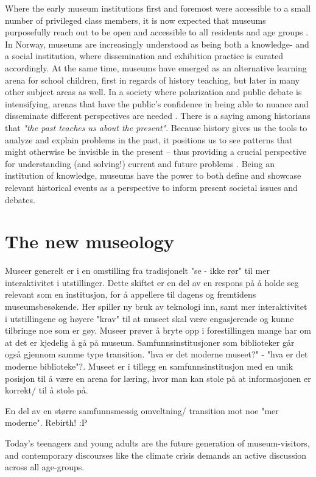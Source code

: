 Where the early museum institutions first and foremost were accessible to a small number of privileged class members, it is now expected that museums purposefully reach out to be open and accessible to all residents and age groups \autocite[p. 14]{melding23}. In Norway, museums are increasingly understood as being both a knowledge- and a social institution, where dissemination and exhibition practice is curated accordingly. At the same time, museums have emerged as an alternative learning arena for school children, first in regards of history teaching, but later in many other subject areas as well. In a society where polarization and public debate is intensifying, arenas that have the public's confidence in being able to nuance and disseminate different perspectives are needed \autocite[p. 7]{melding23}. There is a saying among historians that \emph{"the past teaches us about the present"}. Because history gives us the tools to analyze and explain problems in the past, it positions us to see patterns that might otherwise be invisible in the present – thus providing a crucial perspective for understanding (and solving!) current and future problems \autocite{UW_website}. Being an institution of knowledge, museums have the power to both define and showcase relevant historical events as a perspective to inform present societal issues and debates. 


\section{The new museology}
Museer generelt er i en omstilling fra tradisjonelt "se - ikke rør" til mer interaktivitet i utstillinger. Dette skiftet er en del av en respons på å holde seg relevant som en institusjon, for å appellere til dagens og fremtidens museumsbesøkende. Her spiller ny bruk av teknologi inn, samt mer interaktivitet i utstillingene og høyere "krav" til at museet skal være engasjerende og kunne tilbringe noe som er gøy. Museer prøver å bryte opp i forestillingen mange har om at det er kjedelig å gå på museum. Samfunnsinstitusjoner som biblioteker går også gjennom samme type transition. "hva er det moderne museet?" - "hva er det moderne biblioteke"?. Museet er i tillegg en samfunnsinstitusjon med en unik posisjon til å være en arena for læring, hvor man kan stole på at informasjonen er korrekt/ til å stole på. 

En del av en større samfunnsmessig omveltning/ transition mot noe "mer moderne". Rebirth! :P

Today’s teenagers and young adults are the future generation of museum-visitors, and contemporary discourses like the climate crisis demands an active discussion across all age-groups. %

